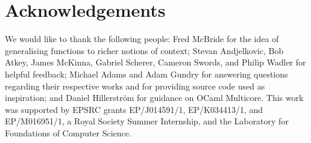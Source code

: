 \documentclass[12pt]{article}
\begin{document}


\section{Acknowledgements}

We would like to thank the following people: Fred McBride for the idea
of generalising functions to richer notions of context;
%
Stevan Andjelkovic, Bob Atkey, James McKinna, Gabriel Scherer, Cameron Swords,
and Philip Wadler for helpful feedback;
%
Michael Adams and Adam Gundry for answering questions regarding their
respective works and for providing source code used as inspiration;
%
and Daniel Hillerstr\"om for guidance on OCaml Multicore.
%
This work was supported by EPSRC grants EP/J014591/1, EP/K034413/1,
and EP/M016951/1, a Royal Society Summer Internship, and the
Laboratory for Foundations of Computer Science.










%
\end{document}
